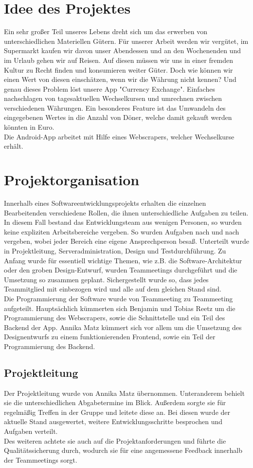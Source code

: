 \documentclass[conference]{IEEEtran}
\begin{document}
\section{Idee des Projektes}
Ein sehr großer Teil unseres Lebens dreht sich um das erwerben von unterschiedlichen Materiellen Gütern. Für unserer Arbeit werden wir vergütet, im Supermarkt kaufen wir davon unser Abendessen und an den Wochenenden und im Urlaub gehen wir auf Reisen. Auf diesen müssen wir uns in einer fremden Kultur zu Recht finden und konsumieren weiter Güter. Doch wie können wir einen Wert von diesen einschätzen, wenn wir die Währung nicht kennen? Und genau dieses Problem löst unsere App "Currency Exchange". Einfaches nachschlagen von tagesaktuellen Wechselkursen und umrechnen zwischen verschiedenen Währungen. Ein besonderes Feature ist das Umwandeln des eingegebenen Wertes in die Anzahl von Döner, welche damit gekauft werden könnten in Euro. \\
Die  Android-App arbeitet mit Hilfe eines Webscrapers, welcher Wechselkurse erhält.

\section{Projektorganisation}
Innerhalb eines Softwareentwicklungsprojekts erhalten die einzelnen Bearbeitenden verschiedene Rollen, die ihnen unterschiedliche Aufgaben zu teilen. In diesem Fall bestand das Entwicklungsteam aus wenigen Personen, so wurden keine expliziten Arbeitsbereiche vergeben.  So wurden Aufgaben nach und nach vergeben, wobei jeder Bereich eine eigene Ansprechperson besaß. Unterteilt wurde in Projektleitung, Serveradministration, Design und Testdurchführung. Zu Anfang wurde für essentiell wichtige Themen, wie z.B. die Software-Architektur oder den groben Design-Entwurf, wurden Teammeetings durchgeführt und die Umsetzung so zusammen geplant. Sichergestellt wurde so, dass jedes Teammitglied mit einbezogen wird und alle auf dem gleichen Stand sind. \\
Die Programmierung der Software wurde von Teammeeting zu Teammeeting aufgeteilt. Hauptsächlich kümmerten sich Benjamin und Tobias Reetz um die Programmierung des Webscrapers, sowie die Schnittstelle und ein Teil des Backend der App. Annika Matz kümmert sich vor allem um die Umsetzung des Designentwurfs zu einem funktionierenden Frontend, sowie ein Teil der Programmierung des Backend.

\subsection{Projektleitung}
Der Projektleitung wurde von Annika Matz übernommen. Unteranderem behielt sie die unterschiedlichen Abgabetermine im Blick. Außerdem sorgte sie für regelmäßig Treffen in der Gruppe und leitete diese an. Bei diesen wurde der aktuelle Stand ausgewertet, weitere Entwicklungsschritte besprochen und Aufgaben verteilt. \\
Des weiteren achtete sie auch auf die Projektanforderungen und führte die Qualitätssicherung durch, wodurch sie für eine angemessene Feedback innerhalb der Teammeetings sorgt.
\end{document}
